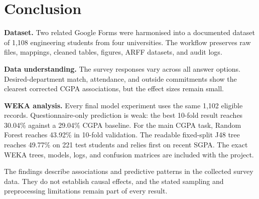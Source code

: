 \section{Conclusion}
\textbf{Dataset.} Two related Google Forms were harmonised into a documented dataset of 1,108 engineering students from four universities. The workflow preserves raw files, mappings, cleaned tables, figures, ARFF datasets, and audit logs.

\textbf{Data understanding.} The survey responses vary across all answer options. Desired-department match, attendance, and outside commitments show the clearest corrected CGPA associations, but the effect sizes remain small.

\textbf{WEKA analysis.} Every final model experiment uses the same 1,102 eligible records. Questionnaire-only prediction is weak: the best 10-fold result reaches 30.04\% against a 29.04\% CGPA baseline. For the main CGPA task, Random Forest reaches 43.92\% in 10-fold validation. The readable fixed-split J48 tree reaches 49.77\% on 221 test students and relies first on recent SGPA. The exact WEKA trees, models, logs, and confusion matrices are included with the project.

The findings describe associations and predictive patterns in the collected survey data. They do not establish causal effects, and the stated sampling and preprocessing limitations remain part of every result.
